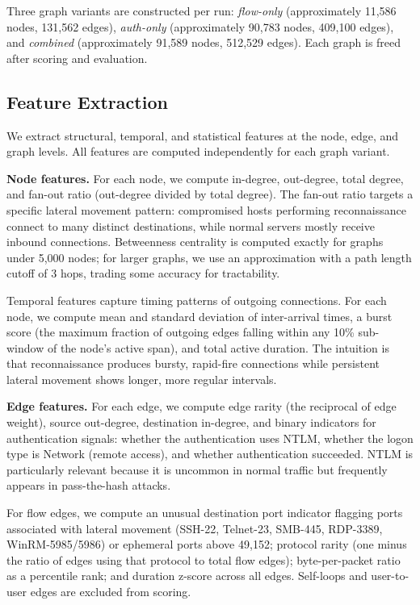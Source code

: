 Three graph variants are constructed per run: \emph{flow-only} (approximately 11,586 nodes, 131,562 edges), \emph{auth-only} (approximately 90,783 nodes, 409,100 edges), and \emph{combined} (approximately 91,589 nodes, 512,529 edges). Each graph is freed after scoring and evaluation.

\subsection{Feature Extraction}

We extract structural, temporal, and statistical features at the node, edge, and graph levels. All features are computed independently for each graph variant.

\textbf{Node features.}
For each node, we compute in-degree, out-degree, total degree, and fan-out ratio (out-degree divided by total degree). The fan-out ratio targets a specific lateral movement pattern: compromised hosts performing reconnaissance connect to many distinct destinations, while normal servers mostly receive inbound connections. Betweenness centrality is computed exactly for graphs under 5,000 nodes; for larger graphs, we use an approximation with a path length cutoff of 3 hops, trading some accuracy for tractability.

Temporal features capture timing patterns of outgoing connections. For each node, we compute mean and standard deviation of inter-arrival times, a burst score (the maximum fraction of outgoing edges falling within any 10\% sub-window of the node's active span), and total active duration. The intuition is that reconnaissance produces bursty, rapid-fire connections while persistent lateral movement shows longer, more regular intervals.

\textbf{Edge features.}
For each edge, we compute edge rarity (the reciprocal of edge weight), source out-degree, destination in-degree, and binary indicators for authentication signals: whether the authentication uses NTLM, whether the logon type is Network (remote access), and whether authentication succeeded. NTLM is particularly relevant because it is uncommon in normal traffic but frequently appears in pass-the-hash attacks.

For flow edges, we compute an unusual destination port indicator flagging ports associated with lateral movement (SSH-22, Telnet-23, SMB-445, RDP-3389, WinRM-5985/5986) or ephemeral ports above 49,152; protocol rarity (one minus the ratio of edges using that protocol to total flow edges); byte-per-packet ratio as a percentile rank; and duration z-score across all edges. Self-loops and user-to-user edges are excluded from scoring.

